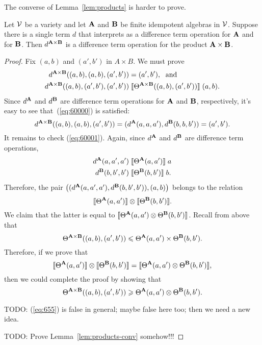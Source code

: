 The converse of Lemma~\ref{lem:products} is harder to prove.
\begin{lem}
  \label{lem:products-conv}
 Let $\mathcal{V}$ be a variety and let $\mathbf{A}$ and $\mathbf{B}$ be finite idempotent
 algebras in $\mathcal{V}$. Suppose there is a single term $d$ that
 interprets as a difference term operation for $\mathbf{A}$ and for $\mathbf{B}$.
 Then $d^{\mathbf{A} \times \mathbf{B}}$ is a difference term operation for the product
 $\mathbf{A} \times \mathbf{B}$.
\end{lem}
\begin{proof}
  Fix $(a, b)$ and $(a', b')$ in $A \times B$.
  We must prove
  \begin{align}
    d^{\bA \times \bB}((a, b), (a, b), (a', b')) &= (a', b'),\; \text{ and } \label{eq:60000}\\
    d^{\bA \times \bB}((a, b), (a', b'), (a', b'))
    &\comr{\Cg^{\bA \times \bB}((a, b), (a', b'))} (a, b). \label{eq:60001}
  \end{align}
  Since $d^{\mathbf{A}}$ and $d^{\mathbf{B}}$ are difference term operations for $\mathbf{A}$ and
  $\mathbf{B}$, respectively, it's easy to see that~(\ref{eq:60000}) is satisfied:
  \[
  d^{\mathbf{A} \times \mathbf{B}}((a, b), (a, b), (a', b')) =
  (d^{\mathbf{A}}(a, a, a'),  d^{\mathbf{B}}(b, b, b')) = (a', b').
  \]
  It remains to check (\ref{eq:60001}).
  Again, since $d^{\mathbf{A}}$ and
  $d^{\mathbf{B}}$ are difference term operations,
  \begin{align*}
  d^{\mathbf{A}}(a,a',a')
  &\mathrel{\llbracket \Theta^{\mathbf{A}}(a,a') \rrbracket} a\\
  d^{\mathbf{B}}(b, b', b')
  &\mathrel{\llbracket \Theta^{\mathbf{B}}(b,b') \rrbracket} b.
  \end{align*}
  Therefore, the pair
  $\bigl((d^{\mathbf{A}}(a,a',a'),d^{\mathbf{B}}(b, b', b')), (a,b)\bigr)$ belongs
  to the relation
  \[
  \llbracket \Theta^{\mathbf{A}}(a,a') \rrbracket
  \otimes
  \llbracket \Theta^{\mathbf{B}}(b,b') \rrbracket.
  \]
  We claim that the latter is equal to
  $\llbracket \Theta^{\mathbf{A}}(a,a') \otimes \Theta^{\mathbf{B}}(b,b') \rrbracket$.
  Recall from above that
  \[
  \Theta^{\mathbf{A} \times \mathbf{B}}((a, b), (a', b'))\leqslant \Theta^{\mathbf{A}}(a,a') \times \Theta^{\mathbf{B}}(b,b').
  \]
  Therefore, if we prove that
  \[
  \llbracket \Theta^{\mathbf{A}}(a,a') \rrbracket  \otimes  \llbracket \Theta^{\mathbf{B}}(b,b') \rrbracket = 
  \llbracket \Theta^{\mathbf{A}}(a,a') \otimes \Theta^{\mathbf{B}}(b,b') \rrbracket,
  \]
  then we could complete the proof by showing that
  \begin{equation}
    \label{eq:655}    
  \Cg^{\bA \times \bB}((a, b), (a', b'))\geq \Cg^{\bA}(a,a') \otimes \Cg^{\bB}(b,b').
  \end{equation}

  \smallskip

  TODO: (\ref{eq:655}) is false in general; maybe false here
  too; then we need a new idea.

  \medskip
  
  TODO: Prove Lemma~\ref{lem:products-conv} somehow!!!
\end{proof}



